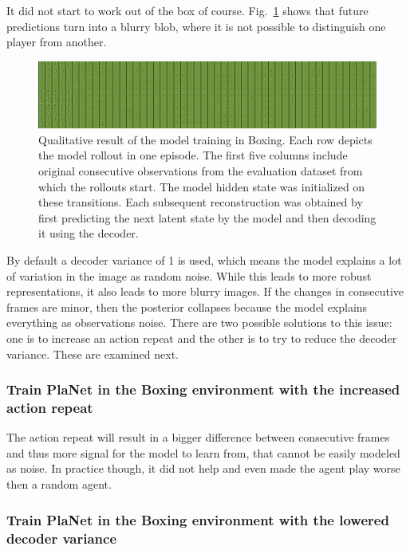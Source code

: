 It did not start to work out of the box of course. Fig.~\ref{Fig.PlaNet_Boxing_original} shows that future predictions turn into a blurry blob, where it is not possible to distinguish one player from another.

\begin{figure}[H]
\includegraphics[width=1\textwidth,keepaspectratio]{figures/PlaNet/Boxing_memory_original.png}
\caption[Qualitative result of the original PlaNet model training in Boxing]{Qualitative result of the model training in Boxing. Each row depicts the model rollout in one episode. The first five columns include original consecutive observations from the evaluation dataset from which the rollouts start. The model hidden state was initialized on these transitions. Each subsequent reconstruction was obtained by first predicting the next latent state by the model and then decoding it using the decoder.}
\label{Fig.PlaNet_Boxing_original}
\end{figure}

By default a decoder variance of 1 is used, which means the model explains a lot of variation in the image as random noise. While this leads to more robust representations, it also leads to more blurry images. If the changes in consecutive frames are minor, then the posterior collapses because the model explains everything as observations noise. There are two possible solutions to this issue: one is to increase an action repeat and the other is to try to reduce the decoder variance. These are examined next.

\subsubsection{Train PlaNet in the Boxing environment with the increased action repeat}

The action repeat will result in a bigger difference between consecutive frames and thus more signal for the model to learn from, that cannot be easily modeled as noise. In practice though, it did not help and even made the agent play worse then a random agent.

\subsubsection{Train PlaNet in the Boxing environment with the lowered decoder variance}

